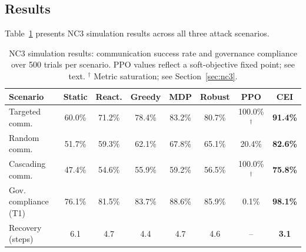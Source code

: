 \documentclass[runningheads]{llncs}
\begin{document}
\subsection{Results}

Table~\ref{tab:nc3} presents NC3 simulation results across all three attack scenarios.

\begin{table}[ht]
\caption{NC3 simulation results: communication success rate and governance compliance over 500 trials per scenario. PPO values reflect a soft-objective fixed point; see text. $^\dagger$ Metric saturation; see Section~\ref{sec:nc3}.}
\label{tab:nc3}
\centering
\footnotesize
\setlength{\tabcolsep}{4pt}
\begin{tabular}{lccccccc}
\toprule
Scenario & Static & React. & Greedy & MDP & Robust & PPO & \textbf{CEI} \\
\midrule
Targeted comm.       & 60.0\% & 71.2\% & 78.4\% & 83.2\% & 80.7\% & 100.0\%$^\dagger$ & \textbf{91.4\%} \\
Random comm.         & 51.7\% & 59.3\% & 62.1\% & 67.8\% & 65.1\% & 20.4\%             & \textbf{82.6\%} \\
Cascading comm.      & 47.4\% & 54.6\% & 55.9\% & 59.2\% & 56.5\% & 100.0\%$^\dagger$ & \textbf{75.8\%} \\
Gov. compliance (T1) & 76.1\% & 81.5\% & 83.7\% & 88.6\% & 85.9\% & 0.1\%             & \textbf{98.1\%} \\
Recovery (steps)     & 6.1    & 4.7    & 4.4    & 4.7    & 4.6    & --                 & \textbf{3.1}    \\
\bottomrule
\end{tabular}
\end{table}
\end{document}
